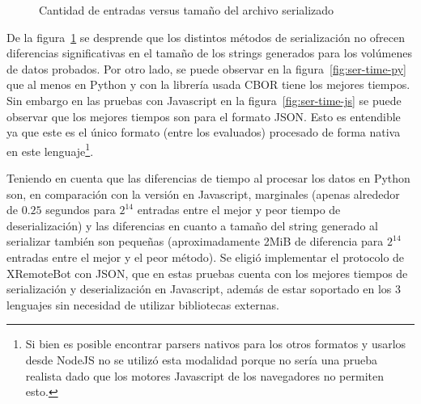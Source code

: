 \begin{figure}
    \centering
    \begin{framed}
    \end{framed}
    \caption{Cantidad de entradas versus tamaño del archivo serializado}
    \label{fig:ser-size}
\end{figure}

De la figura~\ref{fig:ser-size} se desprende que los distintos métodos de
serialización no ofrecen diferencias significativas en el tamaño de los
strings generados para los volúmenes de datos probados. Por otro lado,
se puede observar en la figura~\ref{fig:ser-time-py} que al menos en
Python y con la librería usada CBOR tiene los mejores tiempos. Sin
embargo en las pruebas con Javascript en la figura~\ref{fig:ser-time-js}
se puede observar que los mejores tiempos son para el formato JSON.
Esto es entendible ya que este es el único formato (entre los evaluados) procesado de forma
nativa en este lenguaje\footnote{Si bien es posible encontrar parsers nativos para los
otros formatos y usarlos desde NodeJS no se utilizó esta modalidad porque
no sería una prueba realista dado que los motores Javascript de los
navegadores no permiten esto.}.

Teniendo en cuenta que las diferencias de tiempo al procesar los datos
en Python son, en comparación con la versión en Javascript, marginales
(apenas alrededor de $0.25$ segundos para $2^{14}$
entradas entre el mejor y peor tiempo de deserialización) y las diferencias
en cuanto a tamaño del string generado al
serializar también son pequeñas (aproximadamente 2MiB de diferencia para
$2^{14}$ entradas entre el mejor y el peor método). Se eligió implementar
el protocolo de XRemoteBot con JSON, que en estas pruebas cuenta con los
mejores tiempos de serialización y deserialización en Javascript, además
de estar soportado en los 3 lenguajes sin necesidad de utilizar bibliotecas
externas.


